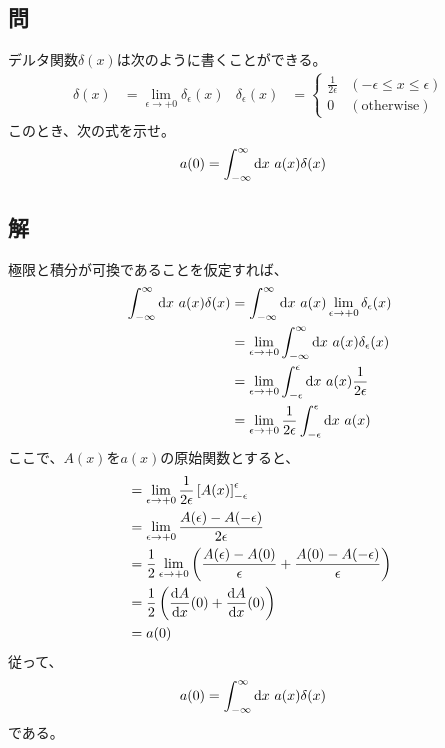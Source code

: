 \subsection{問}
デルタ関数$\delta(x)$は次のように書くことができる。
\begin{align}
	\delta(x)
&=
	\lim_{\epsilon \rightarrow +0}
		\delta_{\epsilon}(x) &
%
%
	\delta_{\epsilon}(x)
&=
	\left\{
	\begin{array}{ll}
		\frac{1}{2\epsilon} &
		(-\epsilon\leq x\leq \epsilon) \\
		0 &
		(\text{otherwise})
	\end{array}
	\right.
\end{align}
このとき、次の式を示せ。
\begin{align}
	a(0)
&=
	\int_{-\infty}^{\infty} {\rm d} x\
		a(x) \delta(x)
\end{align}


\subsection{解}
極限と積分が可換であることを仮定すれば、
\begin{align}
	\int_{-\infty}^{\infty} \d x\
		a(x) \delta(x)
%
%
&=
	\int_{-\infty}^{\infty} \d x\
		a(x)
			\lim_{\epsilon\rightarrow +0}
				\delta_{\epsilon}(x) \\
%
%
&=
	\lim_{\epsilon\rightarrow +0}
		\int_{-\infty}^{\infty} \d x\
			a(x) \delta_{\epsilon}(x) \\
%
%
&=
	\lim_{\epsilon\rightarrow +0}
		\int_{-\epsilon}^{\epsilon} \d x\
			a(x) \frac{1}{2\epsilon} \\
%
%
&=
	\lim_{\epsilon\rightarrow +0}
		\frac{1}{2\epsilon}
			\int_{-\epsilon}^{\epsilon} \d x\
				a(x)
\end{align}
ここで、$A(x)$を$a(x)$の原始関数とすると、
\begin{align}
&=
	\lim_{\epsilon\rightarrow +0}
		\frac{1}{2\epsilon}
			\left[A(x)\right]_{-\epsilon}^{\epsilon} \\
%
%
&=
	\lim_{\epsilon\rightarrow +0}
		\frac{
			A(\epsilon)
			-
			A(-\epsilon)
		}{
			2\epsilon
		} \\
%
%
&=
	\frac{1}{2}
		\lim_{\epsilon\rightarrow +0}\left(
			\frac{A(\epsilon)-A(0)}{\epsilon}
			+
			\frac{A(0)-A(-\epsilon)}{\epsilon}
		\right) \\
%
%
&=
	\frac{1}{2}
		\left(
			\frac{\d A}{\d x}(0)
			+
			\frac{\d A}{\d x}(0)
		\right) \\
%
%
&=
	a(0)
\end{align}
従って、
\begin{align}
	a(0)
&=
	\int_{-\infty}^{\infty} {\rm d} x\
		a(x) \delta(x)
\end{align}
である。


